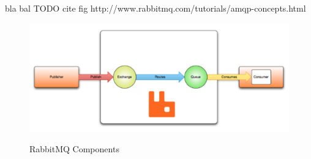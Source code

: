bla bal TODO cite fig http://www.rabbitmq.com/tutorials/amqp-concepts.html
\begin{figure}[htb]
  \centering
  \includegraphics[scale=0.6]{rabbit_mq.png}\\
  \caption{RabbitMQ Components}
  \label{fig:rabbit_mq}
\end{figure}


